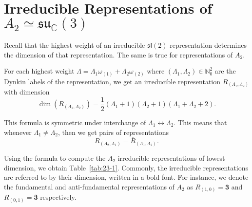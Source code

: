 
\section{Irreducible Representations of \texorpdfstring{$A_2 \simeq \mathfrak{su}_{\mathbb{C}}(3)$}{the Complexified Lie Algebra of SU(3)}}%
\label{sec:irreducible representations_of_lie_algebra_of_su_3_}

Recall that the highest weight of an irreducible $\mathfrak{sl}(2)$ representation determines the dimension of that representation. The same is true for representations of $A_2$.
\begin{claim}
  For each highest weight $ \Lambda = \Lambda_1 \omega_{(1)} + \Lambda_2 \omega_{(2)}$ where $(\Lambda_1, \Lambda_2) \in \mathbb{N}_0^2$ are the Dynkin labels of the representation, we get an irreducible representation $R_{(\Lambda_1, \Lambda_2)}$ with dimension 
  \begin{equation}
    \dim(R_{(\Lambda_1, \Lambda_2)}) = \frac{1}{2} (\Lambda_1 + 1) (\Lambda_2 + 1) (\Lambda_1 + \Lambda_2 + 2).
  \end{equation}
\end{claim}
\begin{corollary}
  This formula is symmetric under interchange of $\Lambda_1 \leftrightarrow \Lambda_2$.  This means that whenever $\Lambda_1 \neq \Lambda_2$, then we get pairs of representations
  \begin{equation}
    R_{(\Lambda_2, \Lambda_1)} = \overline{R}_{(\Lambda_1, \Lambda_2)}.
  \end{equation}
\end{corollary}
Using the formula to compute the $A_2$  irreducible representations of lowest dimension, we obtain Table~\ref{tab:23-1}. Commonly, the irreducible representations are referred to by their dimension, written in a bold font. For instance, we denote the fundamental and anti-fundamental representations of $A_2$ as $R_{(1, 0)} = \boldsymbol 3$ and $R_{(0,1)} = \overline{\boldsymbol 3}{}$ respectively.

